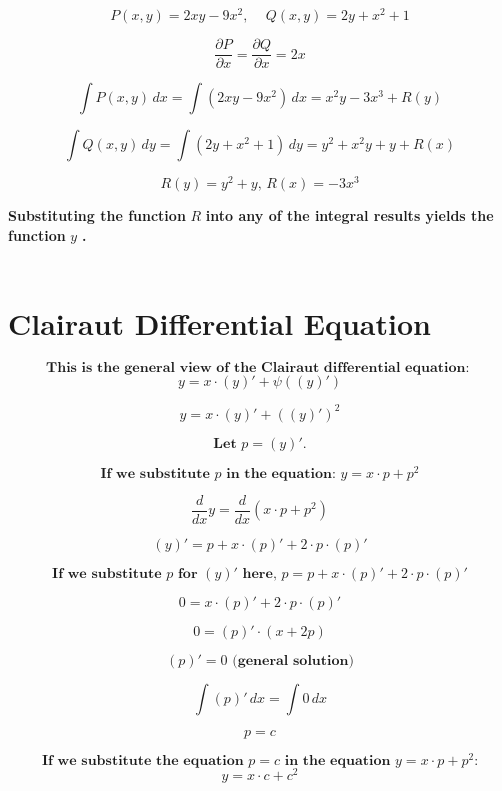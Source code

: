 \documentclass{article}
\begin{document}
    \[
    P(x, y) = 2xy - 9x^2 \textbf{, } \quad Q(x, y) = 2y + x^2 + 1
    \]
    
    \[
    \frac{\partial P}{\partial x} = \frac{\partial Q}{\partial x} = 2x
    \]
    
    \[
    \int P(x, y) \, dx = \int (2xy - 9x^2) \, dx = x^2y - 3x^3 + R(y)
    \]
    
    \[
    \int Q(x, y) \, dy = \int (2y + x^2 + 1) \, dy = y^2 + x^2y + y + R(x)
    \]
    
    \[
    R(y) = y^2 + y \textbf{, } R(x) = -3x^3
    \]
    
    \textbf{Substituting the function } $R$ \textbf{ into any of the integral results yields the function } $y$ \textbf{.}
\\~\\

\section{Clairaut Differential Equation}
    \[
    \textbf{This is the general view of the Clairaut differential equation: }
    \]
    \[
    y = x \cdot \left(y\right)' + \psi\left((y)'\right)
    \]
    
    \[
    y = x \cdot \left(y\right)' + \left(\left(y\right)'\right)^2
    \]
    
    \[
    \textbf{Let } p = \left(y\right)' \textbf{.}
    \]
    
    \[
    \textbf{If we substitute } p \textbf{ in the equation: } y = x \cdot p + p^2
    \]
    
    \[
    \frac{d}{dx} y = \frac{d}{dx} \left(x \cdot p + p^2\right)
    \]
    
    \[
    (y)' = p + x \cdot (p)' + 2 \cdot p \cdot (p)'
    \]
    
    \[
    \textbf{If we substitute } p \textbf{ for } (y)' \textbf{ here, } p = p + x \cdot (p)' + 2 \cdot p \cdot (p)'
    \]
    
    \[
    0 = x \cdot \left(p\right)' + 2 \cdot p \cdot \left(p\right)'
    \]
    
    \[
    0 = \left(p\right)' \cdot \left(x + 2p\right)
    \]
    
    \[
    \left(p\right)' = 0 \textbf{ (general solution)}
    \]
    
    \[
    \int \left(p\right)' \, dx = \int 0 \, dx
    \]
    
    \[
    p = c
    \]
    
    \[
    \textbf{If we substitute the equation } p = c \textbf{ in the equation } y = x \cdot p + p^2 \textbf{:}
    \]
    \[
    y = x \cdot c + c^2
    \]
    
\end{document}
